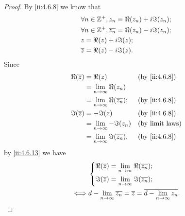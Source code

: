 \begin{proof}
  By \cref{ii:4.6.8} we know that
  \begin{align*}
     & \forall n \in \mathbb{Z}^+, z_n = \Re(z_n) + i \Im(z_n);            \\
     & \forall n \in \mathbb{Z}^+, \overline{z_n} = \Re(z_n) - i \Im(z_n); \\
     & z = \Re(z) + i \Im(z);                                      \\
     & \overline{z} = \Re(z) - i \Im(z).
  \end{align*}
  Since
  \begin{align*}
    \Re(\overline{z}) & = \Re(z)                                   &  & \by{ii:4.6.8}          \\
                      & = \lim_{n \to \infty} \Re(z_n)                                         \\
                      & = \lim_{n \to \infty} \Re(\overline{z_n}); &  & \by{ii:4.6.8}          \\
    \Im(\overline{z}) & = -\Im(z)                                  &  & \by{ii:4.6.8}          \\
                      & = \lim_{n \to \infty} -\Im(z_n)            &  & \text{(by limit laws)} \\
                      & = \lim_{n \to \infty} \Im(\overline{z_n}), &  & \by{ii:4.6.8}
  \end{align*}
  by \cref{ii:4.6.13} we have
  \begin{align*}
         & \begin{dcases}
             \Re(\overline{z}) = \lim_{n \to \infty} \Re(\overline{z_n}); \\
             \Im(\overline{z}) = \lim_{n \to \infty} \Im(\overline{z_n});
           \end{dcases}                                    \\
    \iff & d - \lim_{n \to \infty} \overline{z_n} = \overline{z} = \overline{d - \lim_{n \to \infty} z_n}.
  \end{align*}


\end{proof}
